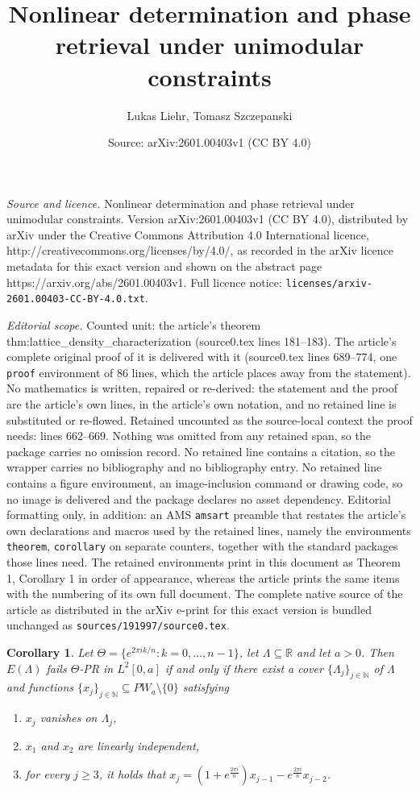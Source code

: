 \documentclass[10pt,a4paper]{amsart}
\title{Nonlinear determination and phase retrieval under unimodular constraints}
\author{Lukas Liehr, Tomasz Szczepanski}
\date{Source: arXiv:2601.00403v1 (CC BY 4.0)}
\newtheorem{corollary}{Corollary}
\def\N{{\mathbb N}}
\def\R{{\mathbb R}}
\begin{document}
\maketitle

\noindent\emph{Source and licence.} Nonlinear determination and phase retrieval under unimodular constraints. Version arXiv:2601.00403v1 (CC BY 4.0), distributed by arXiv under the Creative Commons Attribution 4.0 International licence, http://creativecommons.org/licenses/by/4.0/, as recorded in the arXiv licence metadata for this exact version and shown on the abstract page https://arxiv.org/abs/2601.00403v1. Full licence notice: \texttt{licenses/arxiv-2601.00403-CC-BY-4.0.txt}.\par\smallskip

\noindent\textit{Editorial scope.} Counted unit: the article's theorem thm:lattice\_density\_characterization (source0.tex lines 181--183). The article's complete original proof of it is delivered with it (source0.tex lines 689--774, one \texttt{proof} environment of 86 lines, which the article places away from the statement). No mathematics is written, repaired or re-derived: the statement and the proof are the article's own lines, in the article's own notation, and no retained line is substituted or re-flowed.  Retained uncounted as the source-local context the proof needs: lines 662--669.  Nothing was omitted from any retained span, so the package carries no omission record.  No retained line contains a citation, so the wrapper carries no bibliography and no bibliography entry.  No retained line contains a figure environment, an image-inclusion command or drawing code, so no image is delivered and the package declares no asset dependency.  Editorial formatting only, in addition: an AMS \texttt{amsart} preamble that restates the article's own declarations and macros used by the retained lines, namely the environments \texttt{theorem}, \texttt{corollary} on separate counters, together with the standard packages those lines need.  The retained environments print in this document as Theorem 1, Corollary 1 in order of appearance, whereas the article prints the same items with the numbering of its own full document.  The complete native source of the article as distributed in the arXiv e-print for this exact version is bundled unchanged as \texttt{sources/191997/source0.tex}.
\begin{corollary}\label{cor:PW_recurrence}
Let $\Theta = \{ e^{2\pi i k/n} : k=0,\dots,n-1 \}$, let $\Lambda \subseteq \R$ and let $a>0$. Then $E(\Lambda)$ fails $\Theta$-PR in $L^2[0,a]$ if and only if there exist a cover $\{\Lambda_j\}_{j \in \N}$ of $\Lambda$ and functions $\{ x_j \}_{j \in \N} \subseteq PW_a \setminus \{ 0 \}$ satisfying
\begin{enumerate}
        \item $x_j$ vanishes on $\Lambda_j$,
        \item $x_1$ and $x_2$ are linearly independent,
        \item for every $j \geq 3$, it holds that $x_j = (1+e^{\frac{2\pi i }{n}})x_{j-1} - e^{\frac{2\pi i }{n}} x_{j-2}$.
    \end{enumerate}
\end{corollary}
\end{document}
